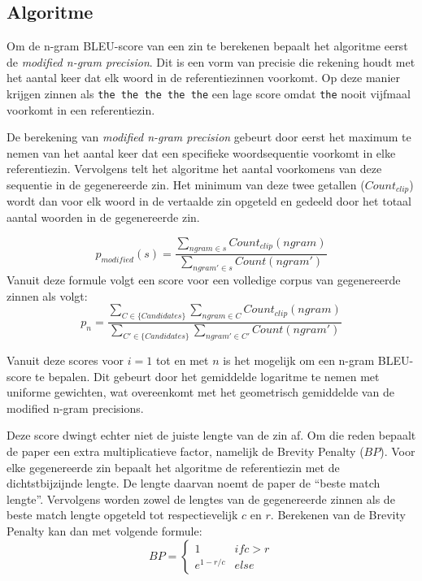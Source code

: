 \subsection{Algoritme}
Om de n-gram BLEU-score van een zin te berekenen bepaalt het algoritme eerst de \textit{modified n-gram precision}. Dit is een vorm van precisie die rekening houdt met het aantal keer dat elk woord in de referentiezinnen voorkomt. Op deze manier krijgen zinnen als \texttt{the the the the the} een lage score omdat \texttt{the} nooit vijfmaal voorkomt in een referentiezin. 

De berekening van \textit{modified n-gram precision} gebeurt door eerst het maximum te nemen van het aantal keer dat een specifieke woordsequentie voorkomt in elke referentiezin. Vervolgens telt het algoritme het aantal voorkomens van deze sequentie in de gegenereerde zin. Het minimum van deze twee getallen ($Count_ {clip}$) wordt dan voor elk woord in de vertaalde zin opgeteld en gedeeld door het totaal aantal woorden in de gegenereerde zin.

\begin{equation}
p_{modified}(s) =
\frac{\sum\limits_{ngram \in s} Count_{clip}(ngram)}{\sum\limits_{ngram' \in s} Count(ngram')}
\label{formule:ngramprecision}
\end{equation}
Vanuit deze formule volgt een score voor een volledige corpus van gegenereerde zinnen als volgt:
\begin{equation}
p_{n} =
\frac{\sum\limits_{C \in \{Candidates\} } \sum\limits_{ngram \in C} Count_{clip}(ngram)}{\sum\limits_{C' \in \{Candidates\} } \sum\limits_{ngram' \in C'} Count(ngram')}
\label{formule:corpus_modified}
\end{equation}

Vanuit deze scores voor $i=1$ tot en met $n$ is het mogelijk om een n-gram BLEU-score te bepalen. Dit gebeurt door het gemiddelde logaritme te nemen met uniforme gewichten, wat overeenkomt met het geometrisch gemiddelde van de modified n-gram precisions. 

Deze score dwingt echter niet de juiste lengte van de zin af. Om die reden bepaalt de paper een extra multiplicatieve factor, namelijk de Brevity Penalty ($BP$). Voor elke gegenereerde zin bepaalt het algoritme de referentiezin met de dichtstbijzijnde lengte. De lengte daarvan noemt de paper de ``beste match lengte''. Vervolgens worden zowel de lengtes van de gegenereerde zinnen als de beste match lengte opgeteld tot respectievelijk $c$ en $r$. Berekenen van de Brevity Penalty kan dan met volgende formule:
\begin{equation}BP=
 \begin{cases}
1 & if c > r \\
e^{1-r/c} & else
\end{cases}
\end{equation}


